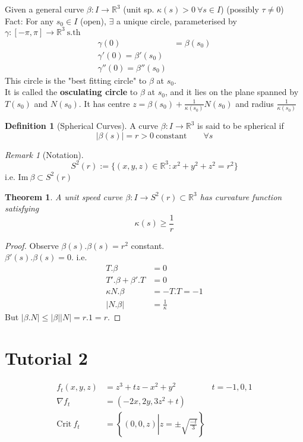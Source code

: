 \documentclass{article}
\newcommand{\sth}{\ \mathrm{s.th\ }}
\newcommand{\R}{\mathbb{R}}
\newcommand{\crit}{\mathrm{Crit}\ }
\newcommand{\im}{\mathrm{Im}\ }
\newcommand{\abs}[1]{\left|#1\right|}
\newtheorem{theorem}{Theorem}[section]
\theoremstyle{definition}
\newtheorem{definition}{Definition}[section]
\theoremstyle{remark}
\theoremstyle{example}
\newtheorem*{remark}{Remark}
\begin{document}
	Given a general curve  $\beta : I \to \R^3$ (unit sp. $\kappa(s)>0\ \forall s \in I$) (possibly $\tau \neq 0$)\\
	Fact: For any $s_0 \in I$ (open), $\exists$ a unique circle, parameterised by $\gamma:[-\pi,\pi]\to \R^3 \sth$
	\begin{align*}
		\gamma(0)&=\beta(s_0)\\
		\gamma'(0)=\beta'(s_0)\\
		\gamma''(0)=\beta''(s_0)
	\end{align*}
	This circle is the "best fitting circle" to $\beta$ at $s_0$.\\
	It is called the \textbf{osculating circle} to $\beta$ at $s_0$, and it lies on the plane spanned by $T(s_0)$ and $N(s_0)$. It has centre $z=\beta(s_0)+\frac{1}{\kappa(s_0)}N(s_0)$ and radius $\frac{1}{\kappa(s_0)}$
	
	\begin{definition}[Spherical Curves]
		A curve $\beta:I\to\R^3$ is said to be spherical if \[\abs{\beta(s)}=r>0\  \mathrm{constant}\qquad \forall s\]
	\end{definition}
	\begin{remark}[Notation]
		\[S^2(r):=\{(x,y,z) \in \R^3:x^2+y^2+z^2=r^2\} \]
		i.e. $\im \beta \subset S^2(r)$
	\end{remark}

	\begin{theorem}
		A unit speed curve $\beta:I\to S^2(r) \subset \R^3$ has curvature function satisfying \[\kappa(s)\geq \frac{1}{r}\] 
	\end{theorem}
	\begin{proof}
		Observe $\beta(s).\beta(s)=r^2$ constant.\\
		$\beta'(s).\beta(s)=0$.
		i.e. \begin{align*}
			T.\beta&=0\\
			T'.\beta+\beta'.T&=0\\
			\kappa N . \beta &=-T.T=-1\\
			\abs{N.\beta} &=\frac{1}{\kappa}
		\end{align*}
		But $\abs{\beta.N}\leq \abs{\beta} \abs{N} = r.1=r$.
	\end{proof}

	\section*{Tutorial 2}
	\begin{align*}
		f_t(x,y,z)&=z^3+tz-x^2+y^2 & t=-1,0,1\\
		\nabla f_t &= (-2x,2y,3z^2+t)\\
		\crit f_t &=\left\{ (0,0,z) \left| z=\pm \sqrt{\frac{-t}{3}}\right. \right\}
	\end{align*}
	
\end{document}
